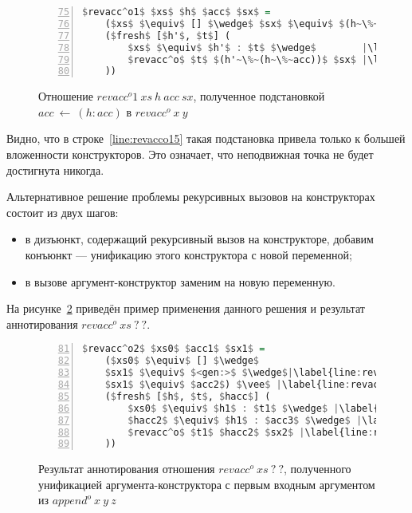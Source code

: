 \begin{figure}[h!]
  \begin{center}
  \begin{minipage}{0.45\textwidth}
  \begin{lstlisting}[language=Haskell, frame=single, numbers=left,numberstyle=\small, firstnumber=75, escapechar=|]
  $revacc^o1$ $xs$ $h$ $acc$ $sx$ =
    ($xs$ $\equiv$ [] $\wedge$ $sx$ $\equiv$ $(h~\%~acc)$) $\vee$ |\label{line:revacco12}|
    ($fresh$ [$h'$, $t$] (
        $xs$ $\equiv$ $h'$ : $t$ $\wedge$        |\label{line:revacco14}|
        $revacc^o$ $t$ $(h'~\%~(h~\%~acc))$ $sx$ |\label{line:revacco15}|
    ))
    \end{lstlisting}
  \end{minipage}
  \end{center}
  \caption{Отношение $revacc^o1 \ xs \ h \ acc \ sx$, полученное подстановкой $acc~\gets~(h:acc)$ в $revacc^o \ x \ y$}
  \label{lst:revacco1}
\end{figure}

Видно, что в строке~\ref{line:revacco15} такая подстановка привела только к большей вложенности конструкторов.
Это означает, что неподвижная точка не будет достигнута никогда.

Альтернативное решение проблемы рекурсивных вызовов на конструкторах состоит из двух шагов:
\begin{itemize}
    \item в дизъюнкт, содержащий рекурсивный вызов на конструкторе, добавим конъюнкт --- унификацию этого конструктора с новой переменной;
    \item в вызове аргумент-конструктор заменим на новую переменную.
\end{itemize}

На рисунке~\ref{lst:revacco2IOOANN} приведён пример применения данного решения и результат аннотирования $revacc^o \ xs \ ? \ ?$.

\begin{figure}[h!]
  \begin{center}
  \begin{minipage}{0.35\textwidth}
  \begin{lstlisting}[language=Haskell, frame=single, numbers=left,numberstyle=\small, firstnumber=81, escapechar=|]
  $revacc^o2$ $xs0$ $acc1$ $sx1$ =
    ($xs0$ $\equiv$ [] $\wedge$
    $sx1$ $\equiv$ $<gen:>$ $\wedge$|\label{line:revacco2IOOANN2}|
    $sx1$ $\equiv$ $acc2$) $\vee$ |\label{line:revacco2IOOANN3}|
    ($fresh$ [$h$, $t$, $hacc$] (
        $xs0$ $\equiv$ $h1$ : $t1$ $\wedge$ |\label{line:revacco2IOOANN5}|
        $hacc2$ $\equiv$ $h1$ : $acc3$ $\wedge$ |\label{line:revacco2IOOANN6}|
        $revacc^o$ $t1$ $hacc2$ $sx2$ |\label{line:revacco2IOOANN7}|
    ))
    \end{lstlisting}
  \end{minipage}
  \end{center}
  \caption{Результат аннотирования отношения $revacc^o \ xs \ ? \ ?$, полученного унификацией аргумента-конструктора с первым входным аргументом из $append^o \ x \ y \ z$}
  \label{lst:revacco2IOOANN}
\end{figure}

